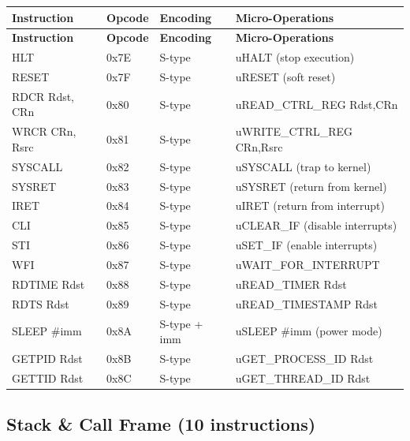 \documentclass[12pt]{article}
\begin{document}
\begin{longtable}{@{}L{2.8cm}L{1.5cm}L{1.7cm}L{4.5cm}@{}}
\toprule
\textbf{Instruction} & \textbf{Opcode} & \textbf{Encoding} & \textbf{Micro-Operations} \\ \midrule
\endfirsthead
\toprule
\textbf{Instruction} & \textbf{Opcode} & \textbf{Encoding} & \textbf{Micro-Operations} \\ \midrule
\endhead
HLT & 0x7E & S-type & uHALT (stop execution) \\
RESET & 0x7F & S-type & uRESET (soft reset) \\
RDCR Rdst, CRn & 0x80 & S-type & uREAD\_CTRL\_REG Rdst,CRn \\
WRCR CRn, Rsrc & 0x81 & S-type & uWRITE\_CTRL\_REG CRn,Rsrc \\
SYSCALL & 0x82 & S-type & uSYSCALL (trap to kernel) \\
SYSRET & 0x83 & S-type & uSYSRET (return from kernel) \\
IRET & 0x84 & S-type & uIRET (return from interrupt) \\
CLI & 0x85 & S-type & uCLEAR\_IF (disable interrupts) \\
STI & 0x86 & S-type & uSET\_IF (enable interrupts) \\
WFI & 0x87 & S-type & uWAIT\_FOR\_INTERRUPT \\
RDTIME Rdst & 0x88 & S-type & uREAD\_TIMER Rdst \\
RDTS Rdst & 0x89 & S-type & uREAD\_TIMESTAMP Rdst \\
SLEEP \#imm & 0x8A & S-type + imm & uSLEEP \#imm (power mode) \\
GETPID Rdst & 0x8B & S-type & uGET\_PROCESS\_ID Rdst \\
GETTID Rdst & 0x8C & S-type & uGET\_THREAD\_ID Rdst \\ \bottomrule
\end{longtable}

\subsection{Stack \& Call Frame (10 instructions)}
\end{document}
